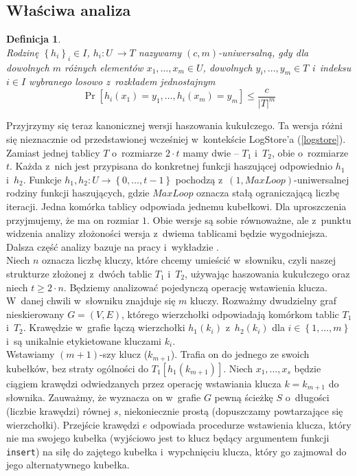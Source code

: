 \documentclass[declaration,shortabstract,masc]{iithesis}
\newtheorem{Def}{Definicja}
\newcommand{\bdf}{\begin{Def}~\\\normalfont\indent}
\newcommand{\edf}{\end{Def}\medskip}
\begin{document}
			\subsection{Właściwa analiza}
				\bdf
					Rodzinę $\left\{h_i\right\}_i\in I$, $h_i: U~\to T$ nazywamy $\left(c, m\right)$-uniwersalną, gdy dla dowolnych $m$ różnych elementów $x_1,\ldots,x_m\in U$, dowolnych $y_i,\ldots,y_m\in T$ i~indeksu $i\in I$ wybranego losowo z~rozkładem jednostajnym
					$$\Pr[h_i(x_1) = y_1,\ldots,h_i(x_m) = y_m]\leq\frac{c}{|T|^m}$$
				\edf
				Przyjrzymy się teraz kanonicznej wersji haszowania kukułczego. Ta wersja różni się nieznacznie od przedstawionej wcześniej w~kontekście LogStore'a (\ref{logstore}). Zamiast jednej tablicy $T$ o~rozmiarze $2\cdot t$ mamy dwie -- $T_1$ i~$T_2$, obie o~rozmiarze $t$. Każda z~nich jest przypisana do konkretnej funkcji haszującej odpowiednio $h_1$ i~$h_2$. Funkcje $h_1, h_2 : U\to\left\{0,\ldots, t - 1\right\}$ pochodzą z~$(1, MaxLoop)$-uniwersalnej rodziny funkcji haszujących, gdzie $MaxLoop$ oznacza stałą ograniczającą liczbę iteracji. Jedna komórka tablicy odpowiada jednemu kubełkowi. Dla uproszczenia przyjmujemy, że ma on rozmiar $1$. Obie wersje są sobie równoważne, ale z~punktu widzenia analizy złożoności wersja z~dwiema tablicami będzie wygodniejsza. Dalsza część analizy bazuje na pracy \cite{CH} i~wykładzie \cite{UW}.\\
				\indent Niech $n$ oznacza liczbę kluczy, które chcemy umieścić w~słowniku, czyli naszej strukturze złożonej z~dwóch tablic $T_1$ i~$T_2$, używając haszowania kukułczego oraz niech $t\geq 2\cdot n$. Będziemy analizować pojedynczą operację wstawienia klucza.\\
				\indent W~danej chwili w~słowniku znajduje się $m$ kluczy. Rozważmy dwudzielny graf nieskierowany $G=(V,E)$, którego wierzchołki odpowiadają komórkom tablic $T_1$ i~$T_2$. Krawędzie w~grafie łączą wierzchołki $h_1(k_i)$ z~$h_2(k_i)$ dla $i\in\left\{1,\ldots,m\right\}$ i~są unikalnie etykietowane kluczami $k_i$.\\
				\indent Wstawiamy $(m+1)$-szy klucz ($k_{m+1}$). Trafia on do jednego ze swoich kubełków, bez straty ogólności do $T_1[h_1(k_{m+1})]$. Niech $x_1,\ldots,x_s$ będzie ciągiem krawędzi odwiedzanych przez operację wstawiania klucza $k = k_{m+1}$ do słownika. Zauważmy, że wyznacza on w~grafie $G$ pewną ścieżkę $S$ o~długości (liczbie krawędzi) równej $s$, niekoniecznie prostą (dopuszczamy powtarzające się wierzchołki). Przejście krawędzi $e$ odpowiada procedurze wstawienia klucza, który nie ma swojego kubełka (wyjściowo jest to klucz będący argumentem funkcji \texttt{insert}) na siłę do zajętego kubełka i~wypchnięciu klucza, który go zajmował do jego alternatywnego kubełka.
\end{document}
